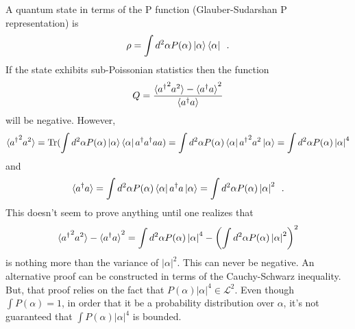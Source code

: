 \begin{homeworkProblem}
    A quantum state in terms of the P function (Glauber-Sudarshan P
    representation) is
    \[
        \rho = \int d^2\alpha P(\alpha) \ket{\alpha}\bra{\alpha} \enskip.
    \]
    If the state exhibits sub-Poissonian statistics then the function
    \[
        Q = \frac{\braket{{a^\dagger}^2 a^2}-\braket{a^\dagger
        a}^2}{\braket{a^\dagger a}}
    \]
    will be negative. However,
    \[
        \braket{{a^\dagger}^2 a^2} = \operatorname{Tr}(\int d^2\alpha P(\alpha) \ket{\alpha}
        \bra{\alpha} a^\dagger a^\dagger a a) = \int d^2\alpha P(\alpha)
        \bra{\alpha} {a^\dagger}^2 a^2 \ket{\alpha} = \int d^2\alpha P(\alpha)
        \left| \alpha \right|^4
    \]
    and
    \[
        \braket{a^\dagger a} = \int d^2\alpha P(\alpha) \bra{\alpha} a^\dagger
        a \ket{\alpha} = \int d^2\alpha P(\alpha) \left| \alpha \right|^2
        \enskip.
    \]
    This doesn't seem to prove anything until one realizes that
    \[
        \braket{{a^\dagger}^2 a^2} - {\braket{a^\dagger a}}^2 = \int d^2\alpha P(\alpha)
        \left| \alpha \right|^4 - \left( \int d^2\alpha P(\alpha) \left| \alpha
        \right|^2 \right)^2
    \]
    is nothing more than the variance of $ \left| \alpha \right|^2 $. This can
    never be negative. An alternative proof can be constructed in terms of the
    Cauchy-Schwarz inequality. But, that proof relies on the fact that $
    P(\alpha) \left| \alpha \right|^4 \in \mathcal{L}^2 $. Even though $ \int
    P(\alpha) = 1 $, in order that it be a probability distribution over $
    \alpha $, it's not guaranteed that $ \int P(\alpha) \left| \alpha \right|^4
    $ is bounded.
\end{homeworkProblem}
